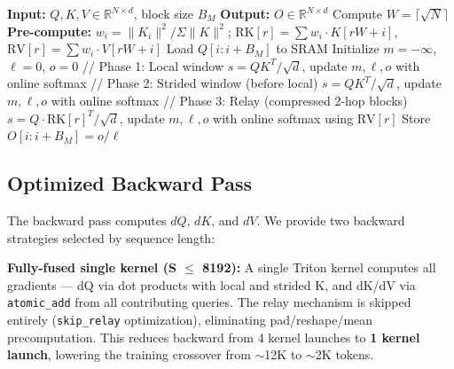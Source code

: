 \documentclass{article}
\begin{document}
    \begin{algorithm}
    \caption{Cron Root Attention Forward Kernel (3-Phase)}
    \begin{algorithmic}
    \STATE \textbf{Input:} $Q, K, V \in \mathbb{R}^{N \times d}$, block size $B_M$
    \STATE \textbf{Output:} $O \in \mathbb{R}^{N \times d}$
    \STATE Compute $W = \lceil\sqrt{N}\rceil$
    \STATE \textbf{Pre-compute:} $w_i = \|K_i\|^2/\Sigma\|K\|^2$; $\text{RK}[r] = \sum w_i \cdot K[rW{+}i]$, $\text{RV}[r] = \sum w_i \cdot V[rW{+}i]$
        \STATE Load $Q[i:i+B_M]$ to SRAM
        \STATE Initialize $m = -\infty$, $\ell = 0$, $o = 0$
        \STATE // Phase 1: Local window
            \STATE $s = QK^T / \sqrt{d}$, update $m, \ell, o$ with online softmax
        \ENDFOR
        \STATE // Phase 2: Strided window (before local)
            \STATE $s = QK^T / \sqrt{d}$, update $m, \ell, o$ with online softmax
        \ENDFOR
        \STATE // Phase 3: Relay (compressed 2-hop blocks)
            \STATE $s = Q \cdot \text{RK}[r]^T / \sqrt{d}$, update $m, \ell, o$ with online softmax using $\text{RV}[r]$
        \ENDFOR
        \STATE Store $O[i:i+B_M] = o / \ell$
    \ENDFOR
    \end{algorithmic}
    \end{algorithm}

    \subsection{Optimized Backward Pass}

    The backward pass computes $dQ$, $dK$, and $dV$. We provide two backward strategies selected by sequence length:

    \textbf{Fully-fused single kernel (S $\leq$ 8192):} A single Triton kernel computes all gradients --- dQ via dot products with local and strided K, and dK/dV via \texttt{atomic\_add} from all contributing queries. The relay mechanism is skipped entirely (\texttt{skip\_relay} optimization), eliminating pad/reshape/mean precomputation. This reduces backward from 4 kernel launches to \textbf{1 kernel launch}, lowering the training crossover from $\sim$12K to $\sim$2K tokens.
\end{document}
